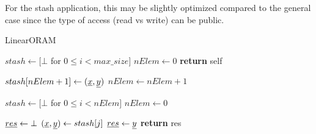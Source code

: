 For the stash application, this may be slightly optimized compared to the 
general case since the type of access (read vs write) can be public.

\begin{algorithm}
\caption{LinearORAM}
\label{alg:obliv_set}
\begin{algorithmic}[1]


\State $stash \gets [ \bot $ for $0 \leq i < max\_size]$
\State $nElem \gets 0$
\State \textbf{return} self
\EndProcedure

\State

\State $stash[nElem + 1] \gets (\underline{ x }, \underline{ y })$
\State $nElem \gets nElem + 1$
\EndProcedure

\State

\State $stash \gets [ \bot $ for $0 \leq i < nElem]$
\State $nElem \gets 0$
\EndProcedure

\State

\State $\underline{ res } \gets \bot$
    \State $(\underline{ x }, \underline{ y }) \gets stash[j]$
        \State $\underline{ res } \gets \underline{ y }$
    \EndOblivIf
\EndFor
\State \textbf{return} res
\EndProcedure

\end{algorithmic}
\end{algorithm}


